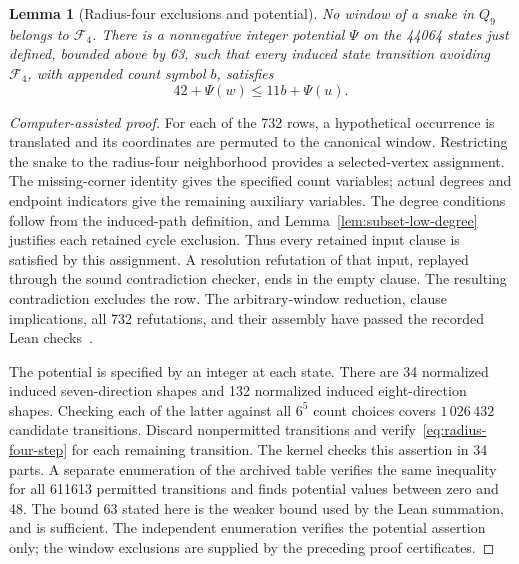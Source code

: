 \documentclass[11pt,a4paper]{article}
\newtheorem{lemma}[theorem]{Lemma}
\theoremstyle{definition}
\theoremstyle{remark}
\newcommand{\Q}{Q}
\begin{document}
\begin{lemma}[Radius-four exclusions and potential]\label{lem:radius-four-certificate}
No window of a snake in $\Q_9$ belongs to $\mathcal F_4$. There is a nonnegative integer potential $\Psi$ on the 44064 states just defined, bounded above by 63, such that every induced state transition avoiding $\mathcal F_4$, with appended count symbol $b$, satisfies
\begin{equation}\label{eq:radius-four-step}
42+\Psi(w)\le11b+\Psi(u).
\end{equation}
\end{lemma}
\begin{proof}[Computer-assisted proof]
For each of the 732 rows, a hypothetical occurrence is translated and its coordinates are permuted to the canonical window. Restricting the snake to the radius-four neighborhood provides a selected-vertex assignment. The missing-corner identity gives the specified count variables; actual degrees and endpoint indicators give the remaining auxiliary variables. The degree conditions follow from the induced-path definition, and Lemma~\ref{lem:subset-low-degree} justifies each retained cycle exclusion. Thus every retained input clause is satisfied by this assignment. A resolution refutation of that input, replayed through the sound contradiction checker, ends in the empty clause. The resulting contradiction excludes the row. The arbitrary-window reduction, clause implications, all 732 refutations, and their assembly have passed the recorded Lean checks~\cite{radiusfourarchive}.

The potential is specified by an integer at each state. There are 34 normalized induced seven-direction shapes and 132 normalized induced eight-direction shapes. Checking each of the latter against all $6^5$ count choices covers $1\,026\,432$ candidate transitions. Discard nonpermitted transitions and verify~\eqref{eq:radius-four-step} for each remaining transition. The kernel checks this assertion in 34 parts. A separate enumeration of the archived table verifies the same inequality for all 611613 permitted transitions and finds potential values between zero and 48. The bound 63 stated here is the weaker bound used by the Lean summation, and is sufficient. The independent enumeration verifies the potential assertion only; the window exclusions are supplied by the preceding proof certificates.
\end{proof}
\end{document}
